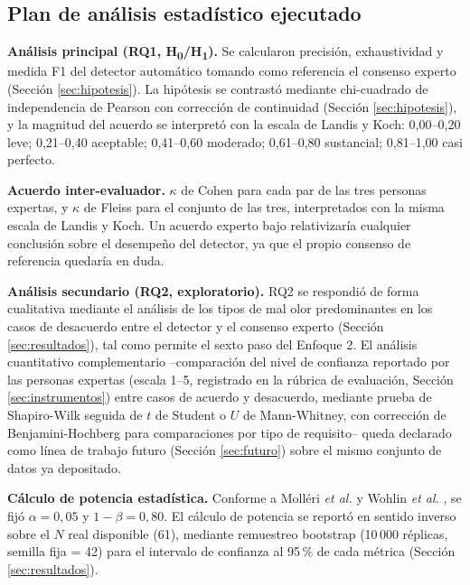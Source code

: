\documentclass[journal,onecolumn]{IEEEtran}
\begin{document}
\subsection{Plan de análisis estadístico ejecutado}
\label{sec:plan-analisis}

\textbf{Análisis principal (RQ1, H\textsubscript{0}/H\textsubscript{1}).}
Se calcularon precisión, exhaustividad y medida F1 del detector automático
tomando como referencia el consenso experto (Sección \ref{sec:hipotesis}).
La hipótesis se contrastó mediante chi-cuadrado de independencia de Pearson
con corrección de continuidad (Sección \ref{sec:hipotesis}), y la magnitud
del acuerdo se interpretó con la escala de Landis y Koch: 0,00--0,20 leve;
0,21--0,40 aceptable; 0,41--0,60 moderado; 0,61--0,80 sustancial;
0,81--1,00 casi perfecto.

\textbf{Acuerdo inter-evaluador.} $\kappa$ de Cohen \cite{cohen1960} para
cada par de las tres personas expertas, y $\kappa$ de Fleiss
\cite{fleiss1971} para el conjunto de las tres, interpretados con la misma
escala de Landis y Koch. Un acuerdo experto bajo relativizaría cualquier
conclusión sobre el desempeño del detector, ya que el propio consenso de
referencia quedaría en duda.

\textbf{Análisis secundario (RQ2, exploratorio).} RQ2 se respondió de forma
cualitativa mediante el análisis de los tipos de mal olor predominantes en
los casos de desacuerdo entre el detector y el consenso experto
(Sección \ref{sec:resultados}), tal como permite el sexto paso del
Enfoque 2. El análisis cuantitativo complementario --comparación del nivel
de confianza reportado por las personas expertas (escala 1--5, registrado
en la rúbrica de evaluación, Sección \ref{sec:instrumentos}) entre casos de
acuerdo y desacuerdo, mediante prueba de Shapiro-Wilk seguida de $t$ de
Student o $U$ de Mann-Whitney, con corrección de Benjamini-Hochberg para
comparaciones por tipo de requisito-- queda declarado como línea de trabajo
futuro (Sección \ref{sec:futuro}) sobre el mismo conjunto de datos ya
depositado.

\textbf{Cálculo de potencia estadística.} Conforme a Molléri \emph{et al.}
\cite{molleri2020} y Wohlin \emph{et al.} \cite{wohlin2012}, se fijó
$\alpha = 0{,}05$ y $1 - \beta = 0{,}80$. El cálculo de potencia se reportó
en sentido inverso sobre el $N$ real disponible (61), mediante remuestreo
bootstrap (10\,000 réplicas, semilla fija = 42) para el intervalo de
confianza al 95\,\% de cada métrica (Sección \ref{sec:resultados}).
\end{document}
